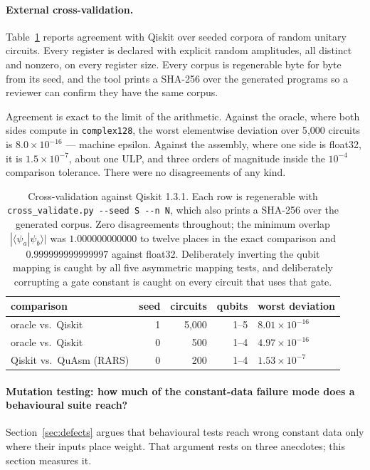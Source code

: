 \documentclass[11pt]{article}
\newcommand{\quasm}{QuAsm}
\begin{document}
\paragraph{External cross-validation.} Table~\ref{tab:xval} reports agreement with
Qiskit over seeded corpora of random unitary circuits. Every register is declared with
explicit random amplitudes, all distinct and nonzero, on every register size. Every corpus is regenerable byte for byte from its seed, and the tool prints
a SHA-256 over the generated programs so a reviewer can confirm they have the same corpus.

Agreement is exact to the limit of the arithmetic. Against the oracle, where both sides
compute in \texttt{complex128}, the worst elementwise deviation over 5{,}000 circuits is
$8.0 \times 10^{-16}$ --- machine epsilon. Against the assembly, where one side is float32,
it is $1.5 \times 10^{-7}$, about one ULP, and three orders of magnitude inside the
$10^{-4}$ comparison tolerance. There were no disagreements of any kind.

\begin{table}[t]
\centering
\begin{tabular}{lrrrl}
\toprule
comparison & seed & circuits & qubits & worst deviation \\
\midrule
oracle vs.\ Qiskit           & 1 & 5{,}000 & 1--5 & $8.01 \times 10^{-16}$ \\
oracle vs.\ Qiskit           & 0 & 500     & 1--4 & $4.97 \times 10^{-16}$ \\
Qiskit vs.\ \quasm{} (RARS)  & 0 & 200     & 1--4 & $1.53 \times 10^{-7}$ \\
\bottomrule
\end{tabular}
\caption{Cross-validation against Qiskit 1.3.1. Each row is regenerable with
\texttt{cross\_validate.py -{}-seed S -{}-n N}, which also prints a SHA-256 over the
generated corpus. Zero disagreements throughout; the minimum
overlap $|\langle\psi_a|\psi_b\rangle|$ was $1.000000000000$ to twelve places in the exact
comparison and $0.999999999999997$ against float32. Deliberately inverting the qubit
mapping is caught by all five asymmetric mapping tests, and deliberately corrupting a gate
constant is caught on every circuit that uses that gate.}
\label{tab:xval}
\end{table}

\paragraph{Mutation testing: how much of the constant-data failure mode does a
behavioural suite reach?} Section~\ref{sec:defects} argues that behavioural tests reach
wrong constant data only where their inputs place weight. That argument rests on three
anecdotes; this section measures it.
\end{document}
